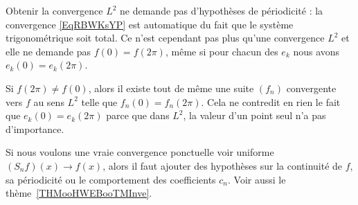 	\begin{normaltext}
		Obtenir la convergence \( L^2\) ne demande pas d'hypothèses de périodicité : la convergence \eqref{EqRBWKsYP} est automatique du fait que le système trigonométrique soit total. Ce n'est cependant pas plus qu'une convergence \( L^2\) et elle ne demande pas \( f(0)=f(2\pi)\), même si pour chacun des \( e_k\) nous avons \( e_k(0)=e_k(2\pi)\).

		Si \( f(2\pi)\neq f(0)\), alors il existe tout de même une suite \( (f_n)\) convergente vers \( f\) au sens \( L^2\) telle que \( f_n(0)=f_n(2\pi)\). Cela ne contredit en rien le fait que \( e_k(0)=e_k(2\pi)\) parce que dans \( L^2\), la valeur d'un point seul n'a pas d'importance.

		Si nous voulons une vraie convergence ponctuelle voir uniforme \( (S_nf)(x)\to f(x)\), alors il faut ajouter des hypothèses sur la continuité de \( f\), sa périodicité ou le comportement des coefficients \( c_n\). Voir aussi le thème~\ref{THMooHWEBooTMInve}.
	\end{normaltext}

